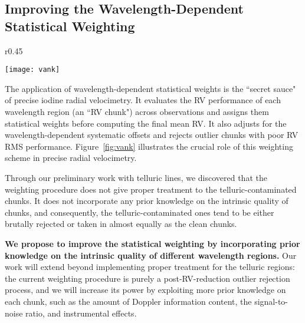 \documentclass[12pt]{article}
\begin{document}
\vspace{-10pt}
\subsection{Improving the Wavelength-Dependent Statistical Weighting}\label{sec:vank}
\vspace{-5pt}

\begin{wrapfigure}{r}{0.45\textwidth}
  \vspace{-25pt}
  \begin{center}
    \texttt{[image: vank]}
  \end{center}
  \vspace{-25pt}  
  \caption{RV RMS of HD 185144 before (gray) and after (black) weighting.} 
  \vspace{-8pt}  
  \label{fig:vank}
\end{wrapfigure}

The application of wavelength-dependent statistical weights is the
``secret sauce" of precise iodine radial velocimetry. It evaluates the
RV performance of each wavelength region (an ``RV chunk") across
observations and assigns them statistical weights before computing the
final mean RV. It also adjusts for the wavelength-dependent systematic
offsets and rejects outlier chunks with poor RV RMS
performance. Figure~\ref{fig:vank} illustrates the crucial role of
this weighting scheme in precise radial velocimetry.

Through our preliminary work with telluric lines, we discovered that
the weighting procedure does not give proper treatment to the
telluric-contaminated chunks. It does not incorporate any prior
knowledge on the intrinsic quality of chunks, and consequently, the
telluric-contaminated ones tend to be either brutally rejected or
taken in almost equally as the clean chunks.

\textbf{We propose to improve the statistical weighting by
  incorporating prior knowledge on the intrinsic quality of different
  wavelength regions.} Our work will extend beyond implementing proper
treatment for the telluric regions: the current weighting procedure is
purely a post-RV-reduction outlier rejection process, and we will
increase its power by exploiting more prior knowledge on each chunk,
such as the amount of Doppler information content, the signal-to-noise
ratio, and instrumental effects.
\end{document}
